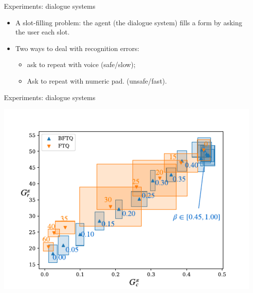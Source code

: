\documentclass{beamer}
\begin{document}
    \begin{frame}{Experiments: dialogue systems}
        \begin{itemize}
            \item A slot-filling problem: the agent (the dialogue system) fills a form by asking the user each slot.
            \pause\item Two ways to deal with recognition errors:
            \begin{itemize}
                \item ask to repeat with voice (safe/slow);
                \item Ask to repeat with numeric pad. (unsafe/fast).
            \end{itemize}
        \end{itemize}

    \end{frame}
    \begin{frame}{Experiments: dialogue systems}
        \begin{center}
            \includegraphics[width=\textwidth]{img/slot-filling.pdf}
        \end{center}
    \end{frame}
\end{document}
